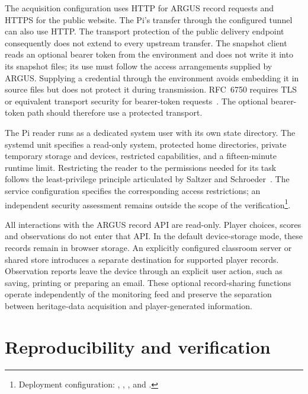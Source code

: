 \documentclass[10pt,a4paper]{article}
\begin{document}
The acquisition configuration uses HTTP for ARGUS record requests and HTTPS for the public website. The Pi's transfer through the configured tunnel can also use HTTP. The transport protection of the public delivery endpoint consequently does not extend to every upstream transfer. The snapshot client reads an optional bearer token from the environment and does not write it into its snapshot files; its use must follow the access arrangements supplied by ARGUS. Supplying a credential through the environment avoids embedding it in source files but does not protect it during transmission. RFC~6750 requires TLS or equivalent transport security for bearer-token requests~\cite{bearer2012}. The optional bearer-token path should therefore use a protected transport.

The Pi reader runs as a dedicated system user with its own state directory. The systemd unit specifies a read-only system, protected home directories, private temporary storage and devices, restricted capabilities, and a fifteen-minute runtime limit. Restricting the reader to the permissions needed for its task follows the least-privilege principle articulated by Saltzer and Schroeder~\cite{saltzer1975}. The service configuration specifies the corresponding access restrictions; an independent security assessment remains outside the scope of the verification\footnote{Deployment configuration: , , , and .}.

All interactions with the ARGUS record API are read-only. Player choices, scores and observations do not enter that API. In the default device-storage mode, these records remain in browser storage. An explicitly configured classroom server or shared store introduces a separate destination for supported player records. Observation reports leave the device through an explicit user action, such as saving, printing or preparing an email. These optional record-sharing functions operate independently of the monitoring feed and preserve the separation between heritage-data acquisition and player-generated information.

\section{Reproducibility and verification}
\end{document}
